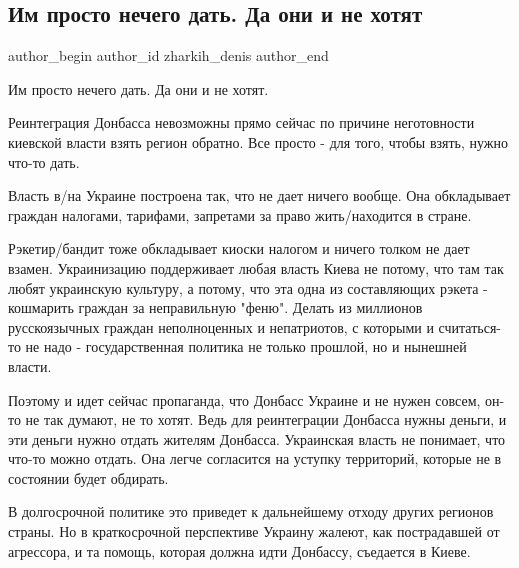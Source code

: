  
 
 
 
 
 
\subsection{Им просто нечего дать. Да они и не хотят}
\label{sec:17_11_2021.fb.zharkih_denis.1.reintegracia_donbass}
 
\ifcmt
 author_begin
   author_id zharkih_denis
 author_end
\fi

Им просто нечего дать. Да они и не хотят. 

Реинтеграция Донбасса невозможны прямо сейчас по причине неготовности киевской
власти взять регион обратно.  Все просто - для того, чтобы взять, нужно что-то
дать. 

Власть в/на Украине построена так, что не дает ничего вообще. Она обкладывает
граждан налогами, тарифами, запретами за право жить/находится в стране. 

Рэкетир/бандит тоже обкладывает киоски налогом и ничего толком не дает взамен.
Украинизацию поддерживает любая власть Киева не потому, что там так любят
украинскую культуру, а потому, что эта одна из составляющих рэкета - кошмарить
граждан за неправильную "феню". Делать из миллионов русскоязычных граждан
неполноценных и непатриотов, с которыми и считаться-то не надо -
государственная политика не только прошлой, но и нынешней власти. 

Поэтому и идет сейчас пропаганда, что Донбасс Украине и не нужен совсем, он-то
не так думают, не то хотят. Ведь для реинтеграции Донбасса нужны деньги, и эти
деньги нужно отдать жителям Донбасса. Украинская власть не понимает, что что-то
можно отдать. Она легче согласится на уступку территорий, которые не в
состоянии будет обдирать. 

В долгосрочной политике это приведет к дальнейшему отходу других регионов
страны. Но в краткосрочной перспективе Украину жалеют, как пострадавшей от
агрессора, и та помощь, которая должна идти Донбассу, съедается в Киеве. 

